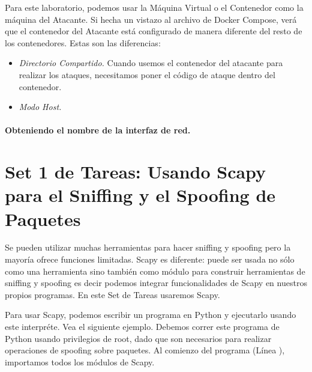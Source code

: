 Para este laboratorio, podemos usar la Máquina Virtual o el Contenedor como la máquina del Atacante. Si hecha un vistazo al archivo de Docker Compose, verá que el contenedor del Atacante está configurado de manera diferente del resto de los contenedores. 
Estas son las diferencias:


\begin{itemize}
\item \textit{Directorio Compartido.} Cuando usemos el contenedor del atacante para realizar los ataques, necesitamos poner el código de ataque dentro del contenedor.




\item \textit{Modo Host.}

\end{itemize}


\paragraph{Obteniendo el nombre de la interfaz de red.}




\section{Set 1 de Tareas: Usando Scapy para el Sniffing y el Spoofing de Paquetes}

Se pueden utilizar muchas herramientas para hacer sniffing y spoofing pero la mayoría ofrece funciones limitadas. Scapy es diferente: puede ser usada no sólo como una herramienta sino también como módulo para construir herramientas de sniffing y spoofing es decir podemos integrar funcionalidades de Scapy en nuestros propios programas. En este Set de Tareas usaremos Scapy.

Para usar Scapy, podemos escribir un programa en Python y ejecutarlo usando este interpréte. Vea el siguiente ejemplo. Debemos correr este programa de Python usando privilegios de root, dado que son necesarios para realizar operaciones de spoofing sobre paquetes.
Al comienzo del programa (Línea ), importamos todos los módulos de Scapy.

